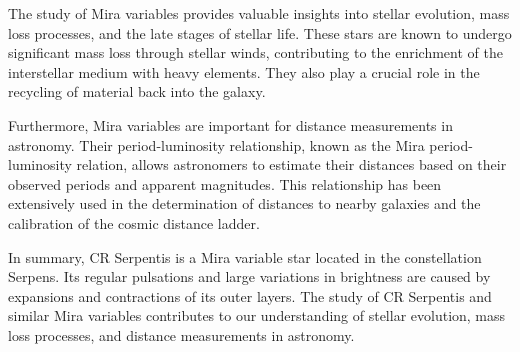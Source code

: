 The study of Mira variables provides valuable insights into stellar evolution, mass loss processes, and the late stages of stellar life. These stars are known to undergo significant mass loss through stellar winds, contributing to the enrichment of the interstellar medium with heavy elements. They also play a crucial role in the recycling of material back into the galaxy.

Furthermore, Mira variables are important for distance measurements in astronomy. Their period-luminosity relationship, known as the Mira period-luminosity relation, allows astronomers to estimate their distances based on their observed periods and apparent magnitudes. This relationship has been extensively used in the determination of distances to nearby galaxies and the calibration of the cosmic distance ladder.

In summary, CR Serpentis is a Mira variable star located in the constellation Serpens. Its regular pulsations and large variations in brightness are caused by expansions and contractions of its outer layers. The study of CR Serpentis and similar Mira variables contributes to our understanding of stellar evolution, mass loss processes, and distance measurements in astronomy.



